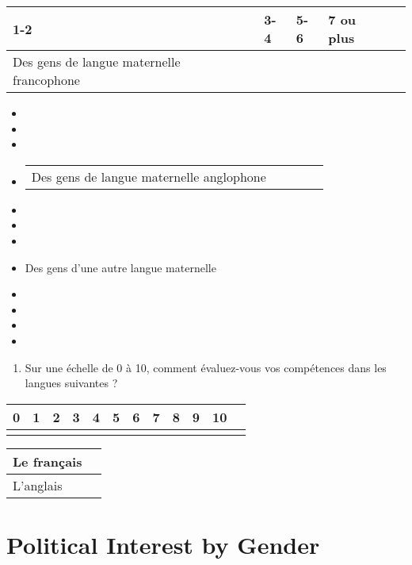 \documentclass[
  letterpaper,
  DIV=11,
  numbers=noendperiod]{scrreprt}
\providecommand{\tightlist}{%
  \setlength{\itemsep}{0pt}\setlength{\parskip}{0pt}}\usepackage{longtable,booktabs,array}
\begin{document}
\begin{longtable}[]{@{}lllll@{}}
\toprule\noalign{}
1-2 & 3-4 & 5-6 & 7 ou plus & \\
\midrule\noalign{}
\endhead
\bottomrule\noalign{}
\endlastfoot
Des gens de langue maternelle francophone & & & & \\
\end{longtable}

\begin{itemize}
\item
\item
\item
\item
  \begin{longtable}[]{@{}lllll@{}}
  \toprule\noalign{}
  \endhead
  \bottomrule\noalign{}
  \endlastfoot
  Des gens de langue maternelle anglophone & & & & \\
  \end{longtable}
\item
\item
\item
\item
  \hfill\break
  Des gens d'une autre langue maternelle \textbar{}
\item
\item
\item
\item
\end{itemize}

\begin{enumerate}
\def\labelenumi{\arabic{enumi}.}
\setcounter{enumi}{65}
\tightlist
\item
  Sur une échelle de 0 à 10, comment évaluez-vous vos compétences dans
  les langues suivantes ?
\end{enumerate}

\begin{longtable}[]{@{}llllllllllll@{}}
\toprule\noalign{}
0 & 1 & 2 & 3 & 4 & 5 & 6 & 7 & 8 & 9 & 10 & \\
\midrule\noalign{}
\endhead
\bottomrule\noalign{}
\endlastfoot
\end{longtable}

\begin{longtable}[]{@{}ll@{}}
\toprule\noalign{}
Le français & \\
\midrule\noalign{}
\endhead
\bottomrule\noalign{}
\endlastfoot
L'anglais & \\
\end{longtable}

\hypertarget{sec-appendix4}{%
\chapter{Political Interest by Gender}\label{sec-appendix4}}
\end{document}
